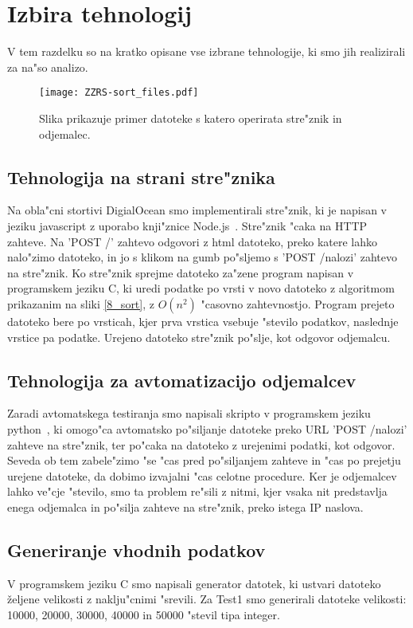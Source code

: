 \section{Izbira tehnologij}
V tem razdelku so na kratko opisane vse izbrane tehnologije, ki smo jih realizirali za na"so analizo.

\begin{figure}
  \centering
    \texttt{[image: ZZRS-sort\_files.pdf]}
  \caption{Slika prikazuje primer datoteke s katero operirata stre"znik in odjemalec.}
  \label{8_files}  
\end{figure}

\subsection{Tehnologija na strani stre"znika }
Na obla"cni stortivi DigialOcean smo implementirali stre"znik, ki je napisan v jeziku javascript z uporabo knji"znice Node.js~\cite{8_nodejs}. Stre"znik "caka na HTTP zahteve. Na 'POST /' zahtevo odgovori z html datoteko, preko katere lahko nalo"zimo datoteko, in jo s klikom na gumb po"sljemo s 'POST /nalozi' zahtevo na stre"znik. Ko stre"znik sprejme datoteko za"zene program napisan v programskem jeziku C, ki uredi podatke po vrsti v novo datoteko z algoritmom prikazanim na sliki \ref{8_sort}, z $O(n^2)$ "casovno zahtevnostjo. Program prejeto datoteko bere po vrsticah, kjer prva  vrstica vsebuje "stevilo podatkov, naslednje vrstice pa podatke. Urejeno datoteko stre"znik po"slje, kot odgovor odjemalcu. 

\subsection{Tehnologija za avtomatizacijo odjemalcev}
Zaradi avtomatskega testiranja smo napisali skripto v programskem jeziku python~\cite{8_python}, ki omogo"ca avtomatsko po"siljanje datoteke preko URL 'POST /nalozi' zahteve na stre"znik, ter po"caka na datoteko z urejenimi podatki, kot odgovor. Seveda ob tem zabele"zimo "se "cas pred po"siljanjem zahteve in "cas po prejetju urejene datoteke, da dobimo izvajalni "cas celotne procedure. Ker je odjemalcev lahko ve"cje "stevilo, smo ta problem re"sili z nitmi, kjer vsaka nit predstavlja enega odjemalca in po"silja zahteve na stre"znik, preko istega IP naslova.

\subsection{Generiranje vhodnih podatkov}
V programskem jeziku C smo napisali generator datotek, ki ustvari datoteko željene velikosti z naklju"cnimi "srevili. Za Test1 smo generirali datoteke velikosti: 10000, 20000, 30000, 40000 in 50000 "stevil tipa integer.

